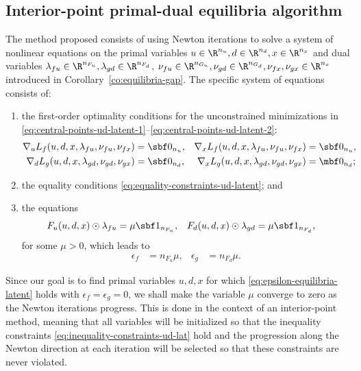 \documentclass[11pt]{article}
\begin{document}
\subsection{Interior-point primal-dual equilibria algorithm}

The method proposed consists of using Newton iterations to solve a
system of nonlinear equations on the primal variables
$u\in\R^{n_u},d\in\R^{n_d},x\in\R^{n_x}$ and dual variables
$\lambda_{fu}\in\R^{n_{F_u}},\lambda_{gd}\in\R^{n_{F_d}}$,
$\nu_{fu}\in\R^{n_{G_u}},\nu_{gd}\in\R^{n_{G_d}},\nu_{fx},\nu_{gx}\in\R^{n_x}$
introduced in Corollary~\ref{co:equilibria-gap}. The specific system
of equations consists of:
\begin{enumerate}
\item the first-order optimality conditions for the unconstrained
  minimizations in
  \eqref{eq:central-points-ud-latent-1}--\eqref{eq:central-points-ud-latent-2}:
  \begin{subequations}\label{eq:equilibrium-latent}
    \begin{align}
      \nabla_u L_f(u,d,x,\lambda_{fu},\nu_{fu},\nu_{fx})&=\sbf 0_{n_u}, &
      \nabla_x L_f(u,d,x,\lambda_{fu},\nu_{fu},\nu_{fx})&=\sbf 0_{n_u}, \\
      \nabla_d L_g(u,d,x,\lambda_{gd},\nu_{gd},\nu_{gx})&=\sbf 0_{n_d}, & \nabla_x
      L_g(u,d,x,\lambda_{gd},\nu_{gd},\nu_{gx})&=\mbf
      0_{n_d}; &
    \end{align}
  \end{subequations}
\item the equality conditions \eqref{eq:equality-constraints-ud-latent}; and
\item the equations
  \begin{align}\label{eq:barrier-ud-latent}
    F_u(u,d,x)\odot\lambda_{fu}&=\mu\sbf 1_{n_{F_u}}, &
    F_d(u,d,x)\odot\lambda_{gd}&=\mu\sbf 1_{n_{F_d}}, &
  \end{align}
  for some $\mu>0$, which leads to
  \begin{align*}
    \epsilon_f&=n_{F_u} \mu, & \epsilon_g&=n_{F_d} \mu.
  \end{align*}
\end{enumerate}
Since our goal is to find primal variables $u,d,x$ for which
\eqref{eq:epsilon-equilibria-latent} holds with $\epsilon_f=\epsilon_g=0$, we shall make
the variable $\mu$ converge to zero as the Newton iterations
progress. This is done in the context of an interior-point method,
meaning that all variables will be initialized so that the inequality
constraints \eqref{eq:inequality-constraints-ud-lat} hold and the progression
along the Newton direction at each iteration will be selected so that
these constraints are never violated.
\end{document}
